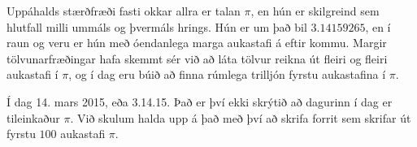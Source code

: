 
Uppáhalds stærðfræði fasti okkar allra er talan $\pi$, en hún er skilgreind sem
hlutfall milli ummáls og þvermáls hrings. Hún er um það bil $3.14159265$, en í
raun og veru er hún með óendanlega marga aukastafi á eftir kommu. Margir
tölvunarfræðingar hafa skemmt sér við að láta tölvur reikna út fleiri og fleiri
aukastafi í $\pi$, og í dag eru búið að finna rúmlega trilljón fyrstu
aukastafina í $\pi$.

Í dag 14. mars 2015, eða 3.14.15. Það er því ekki skrýtið að dagurinn í dag er
tileinkaður $\pi$. Við skulum halda upp á það með því að skrifa forrit sem
skrifar út fyrstu $100$ aukastafi $\pi$.


